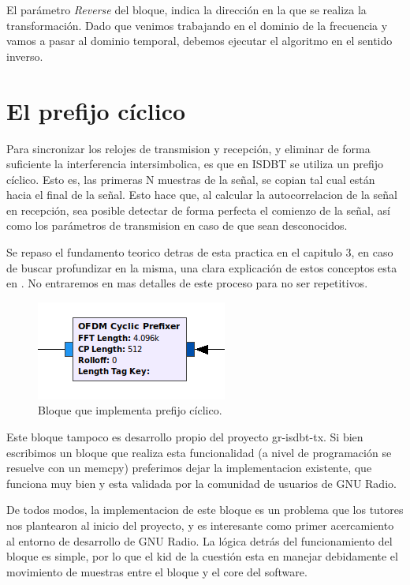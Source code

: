 El parámetro \textit{Reverse} del bloque, indica la dirección en la que se realiza la transformación. Dado que venimos trabajando en el dominio de la frecuencia y vamos a pasar al dominio temporal, debemos ejecutar el algoritmo en el sentido inverso.

\section{El prefijo cíclico}

Para sincronizar los relojes de transmision y recepción, y eliminar de forma suficiente la interferencia intersimbolica, es que en ISDBT se utiliza un prefijo cíclico. Esto es, las primeras N muestras de la señal, se copian tal cual están hacia el final de la señal. Esto hace que, al calcular la autocorrelacion de la señal en recepción, sea posible detectar de forma perfecta el comienzo de la señal, así como los parámetros de transmision en caso de que sean desconocidos. 

Se repaso el fundamento teorico detras de esta practica en el capitulo 3, en caso de buscar profundizar en la misma, una clara explicación de estos conceptos esta en \cite{gr-isdbt}. No entraremos en mas detalles de este proceso para no ser repetitivos.

\begin{figure}[!h]
	\centering
	\includegraphics[scale=0.5]{figuras/cap05/cp}
	\caption{\label{f:cp} Bloque que implementa prefijo cíclico.}
\end{figure}

Este bloque tampoco es desarrollo propio del proyecto gr-isdbt-tx. Si bien escribimos un bloque que realiza esta funcionalidad (a nivel de programación se resuelve con un memcpy) preferimos dejar la implementacion existente, que funciona muy bien y esta validada por la comunidad de usuarios de GNU Radio.

De todos modos, la implementacion de este bloque es un problema que los tutores nos plantearon al inicio del proyecto, y es interesante como primer acercamiento al entorno de desarrollo de GNU Radio. La lógica detrás del funcionamiento del bloque es simple, por lo que el kid de la cuestión esta en manejar debidamente el movimiento de muestras entre el bloque y el core del software.

